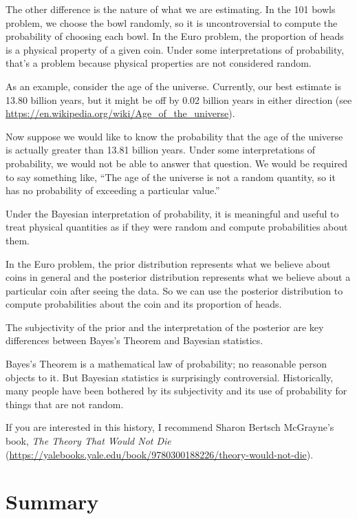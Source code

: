 \documentclass[12pt]{book}
\theoremstyle{exercise}
\begin{document}
The other difference is the nature of what we are estimating.
In the 101 bowls problem, we choose the bowl randomly, so it is uncontroversial to compute the probability of choosing each bowl.
In the Euro problem, the proportion of heads is a physical property of a given coin.
Under some interpretations of probability, that's a problem because physical properties are not considered random.

As an example, consider the age of the universe.
Currently, our best estimate is 13.80 billion years, but it might be off by 0.02 billion years in either direction (see \url{https://en.wikipedia.org/wiki/Age_of_the_universe}).

Now suppose we would like to know the probability that the age of the universe is actually greater than 13.81 billion years.
Under some interpretations of probability, we would not be able to answer that question.
We would be required to say something like, ``The age of the universe is not a random quantity, so it has no probability of exceeding a particular value.''

Under the Bayesian interpretation of probability, it is meaningful and useful to treat physical quantities as if they were random and compute probabilities about them.

In the Euro problem, the prior distribution represents what we believe about coins in general and the posterior distribution represents what we believe about a particular coin after seeing the data.
So we can use the posterior distribution to compute probabilities about the coin and its proportion of heads.

The subjectivity of the prior and the interpretation of the posterior are key differences between Bayes's Theorem and Bayesian statistics.

Bayes's Theorem is a mathematical law of probability; no reasonable person objects to it.
But Bayesian statistics is surprisingly controversial.
Historically, many people have been bothered by its subjectivity and its use of probability for things that are not random.

If you are interested in this history, I recommend Sharon Bertsch McGrayne's book, {\it The Theory That Would Not Die} (\url{https://yalebooks.yale.edu/book/9780300188226/theory-would-not-die}).



\section{Summary}
\end{document}
